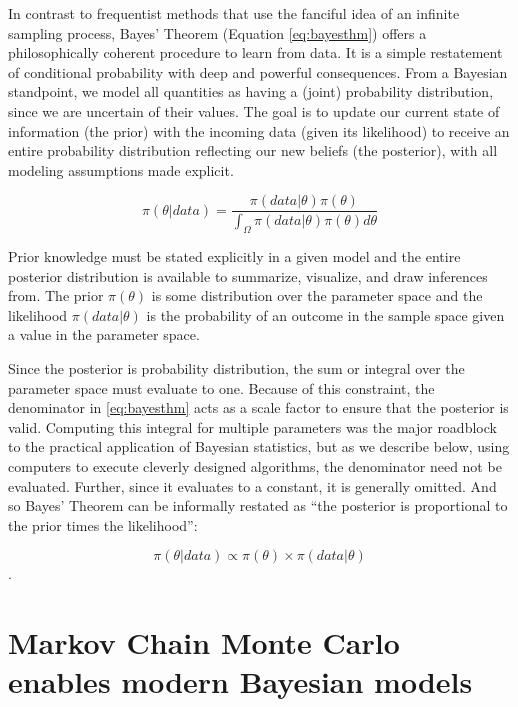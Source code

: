 \documentclass[11pt, oneside, openany]{scrbook}
\begin{document}
In contrast to frequentist methods that use the fanciful idea of an infinite sampling process, Bayes' Theorem (Equation \eqref{eq:bayesthm}) offers a philosophically coherent procedure to learn from data. It is a simple restatement of conditional probability with deep and powerful consequences. From a Bayesian standpoint, we model all quantities as having a (joint) probability distribution, since we are uncertain of their values. The goal is to update our current state of information (the prior) with the incoming data (given its likelihood) to receive an entire probability distribution reflecting our new beliefs (the posterior), with all modeling assumptions made explicit.

\begin{equation}
  \pi(\theta | data) = \frac{\pi(data | \theta) \pi(\theta)}{\int_\Omega \pi(data | \theta) \pi(\theta) d\theta}
  \label{eq:bayesthm}
\end{equation}

Prior knowledge must be stated explicitly in a given model and the entire posterior distribution is available to summarize, visualize, and draw inferences from. The prior \(\pi(\theta)\) is some distribution over the parameter space and the likelihood \(\pi(data | \theta)\) is the probability of an outcome in the sample space given a value in the parameter space.

Since the posterior is probability distribution, the sum or integral over the parameter space must evaluate to one. Because of this constraint, the denominator in \eqref{eq:bayesthm} acts as a scale factor to ensure that the posterior is valid. Computing this integral for multiple parameters was the major roadblock to the practical application of Bayesian statistics, but as we describe below, using computers to execute cleverly designed algorithms, the denominator need not be evaluated. Further, since it evaluates to a constant, it is generally omitted. And so Bayes' Theorem can be informally restated as ``the posterior is proportional to the prior times the likelihood'':

\[\pi(\theta \vert data) \propto \pi(\theta) \times \pi(data \vert \theta)\].

\hypertarget{markov-chain-monte-carlo-enables-modern-bayesian-models}{%
\section{Markov Chain Monte Carlo enables modern Bayesian models}\label{markov-chain-monte-carlo-enables-modern-bayesian-models}}
\end{document}
